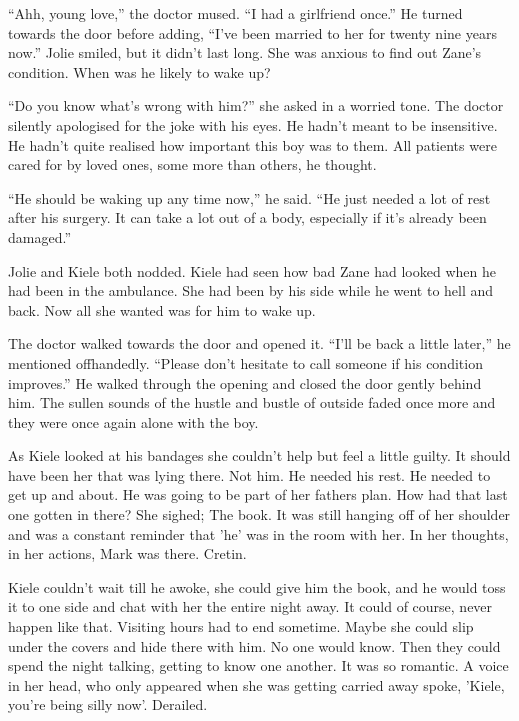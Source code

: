 ``Ahh, young love,'' the doctor mused.  ``I had a girlfriend once.''  He turned towards the door before adding, ``I've been married to her for twenty nine years now.''  Jolie smiled, but it didn't last long.  She was anxious to find out Zane's condition.  When was he likely to wake up?

``Do you know what's wrong with him?'' she asked in a worried tone.  The doctor silently apologised for the joke with his eyes.  He hadn't meant to be insensitive.  He hadn't quite realised how important this boy was to them.  All patients were cared for by loved ones, some more than others, he thought.

``He should be waking up any time now,'' he said.  ``He just needed a lot of rest after his surgery.  It can take a lot out of a body, especially if it's already been damaged.''  

Jolie and Kiele both nodded.  Kiele had seen how bad Zane had looked when he had been in the ambulance.  She had been by his side while he went to hell and back.  Now all she wanted was for him to wake up.  

The doctor walked towards the door and opened it.  ``I'll be back a little later,'' he mentioned offhandedly.  ``Please don't hesitate to call someone if his condition improves.''  He walked through the opening and closed the door gently behind him.  The sullen sounds of the hustle and bustle of outside faded once more and they were once again alone with the boy.

As Kiele looked at his bandages she couldn't help but feel a little guilty.  It should have been her that was lying there.  Not him.  He needed his rest.  He needed to get up and about.  He was going to be part of her fathers plan.  How had that last one gotten in there?  She sighed; The book.  It was still hanging off of her shoulder and was a constant reminder that 'he' was in the room with her.  In her thoughts, in her actions, Mark was there.  Cretin.  

Kiele couldn't wait till he awoke, she could give him the book, and he would toss it to one side and chat with her the entire night away.  It could of course, never happen like that.  Visiting hours had to end sometime.  Maybe she could slip under the covers and hide there with him.  No one would know.  Then they could spend the night talking, getting to know one another.  It was so romantic.  A voice in her head, who only appeared when she was getting carried away spoke, 'Kiele, you're being silly now'.  Derailed.

